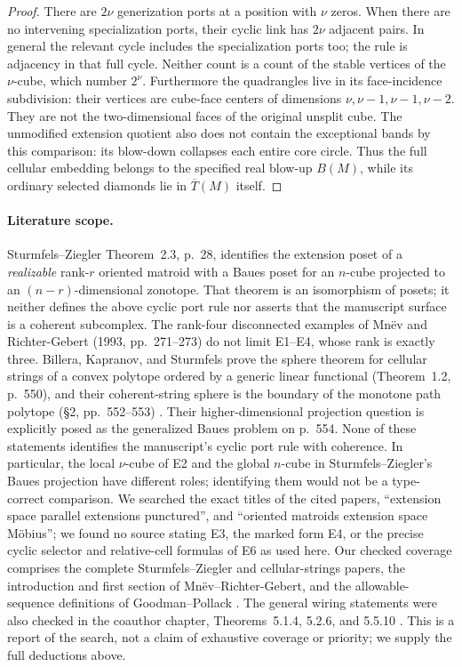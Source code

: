 \begin{proof}
There are $2\nu$ generization ports at a position with $\nu$ zeros. When
there are no intervening specialization ports, their cyclic link has
$2\nu$ adjacent pairs. In general the relevant cycle includes the
specialization ports too; the rule is adjacency in that full cycle. Neither
count is a count of the stable vertices of the $\nu$-cube, which number
$2^\nu$. Furthermore the quadrangles live in its face-incidence subdivision:
their vertices are cube-face centers of dimensions $\nu,\nu-1,\nu-1,\nu-2$.
They are not the two-dimensional faces of the original unsplit cube.
The unmodified extension quotient also does not contain the exceptional
bands by this comparison: its blow-down collapses each entire core
circle. Thus the full cellular embedding belongs to the specified real
blow-up $B(M)$, while its ordinary selected diamonds lie in
$\overline T(M)$ itself.
\end{proof}

\paragraph{Literature scope.}
Sturmfels--Ziegler Theorem~2.3, p.~28, identifies the extension poset of a
\emph{realizable} rank-$r$ oriented matroid with a Baues poset for an
$n$-cube projected to an $(n-r)$-dimensional zonotope. That theorem is an
isomorphism of posets; it neither defines the above cyclic port rule nor
asserts that the manuscript surface is a coherent subcomplex. The rank-four
disconnected examples of Mn\"ev and Richter-Gebert (1993, pp.~271--273)
\cite{MnevRichterGebert1993} do not limit E1--E4, whose rank is exactly three.
Billera, Kapranov, and Sturmfels prove the sphere theorem for cellular
strings of a convex polytope ordered by a generic linear functional
(Theorem~1.2, p.~550), and their coherent-string sphere is the boundary
of the monotone path polytope (\S2, pp.~552--553)
\cite{BilleraKapranovSturmfels1994}. Their higher-dimensional projection
question is explicitly posed as the generalized Baues problem on p.~554.
None of these statements identifies the manuscript's cyclic port rule
with coherence. In particular, the local $\nu$-cube of E2 and the global
$n$-cube in Sturmfels--Ziegler's Baues projection have different roles;
identifying them would not be a type-correct comparison.
We searched the exact titles of the cited papers, ``extension space parallel
extensions punctured'', and ``oriented matroids extension space M\"obius'';
we found no source stating E3, the marked form E4, or the precise cyclic
selector and relative-cell formulas of E6 as used here. Our checked
coverage comprises the complete Sturmfels--Ziegler and cellular-strings
papers, the introduction and first section of Mn\"ev--Richter-Gebert,
and the allowable-sequence definitions of Goodman--Pollack
\cite{GoodmanPollack1980}. The general wiring statements were also
checked in the coauthor chapter, Theorems~5.1.4, 5.2.6, and 5.5.10
\cite{FelsnerGoodman2017}. This is a
report of the search, not a claim of exhaustive coverage or priority;
we supply the full deductions above.
